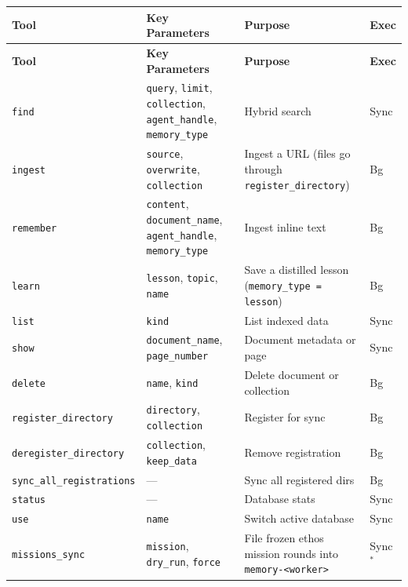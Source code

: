 \documentclass[a4paper,10pt]{article}
\newcommand{\tool}[1]{\texttt{#1}}
\newcommand{\field}[1]{\texttt{#1}}
\begin{document}
\begin{center}
\small
\setlength{\tabcolsep}{4pt}
\begin{longtable}{lp{3.5cm}p{3.2cm}l}
\toprule
\textbf{Tool} & \textbf{Key Parameters} & \textbf{Purpose} &
  \textbf{Exec} \\
\midrule
\endfirsthead
\toprule
\textbf{Tool} & \textbf{Key Parameters} & \textbf{Purpose} &
  \textbf{Exec} \\
\midrule
\endhead
\tool{find}        & \field{query}, \field{limit},
  \field{collection}, \field{agent\_handle},
  \field{memory\_type}     & Hybrid search              & Sync \\
\tool{ingest}      & \field{source}, \field{overwrite},
  \field{collection}       & Ingest a URL (files go through
                             \tool{register\_directory}) & Bg \\
\tool{remember}    & \field{content},
  \field{document\_name}, \field{agent\_handle},
  \field{memory\_type}     & Ingest inline text         & Bg \\
\tool{learn}       & \field{lesson}, \field{topic},
  \field{name}             & Save a distilled lesson
                             (\texttt{memory\_type = lesson}) & Bg \\
\tool{list}        & \field{kind}
                           & List indexed data          & Sync \\
\tool{show}        & \field{document\_name},
  \field{page\_number}     & Document metadata or page  & Sync \\
\tool{delete}      & \field{name}, \field{kind}
                           & Delete document or
                             collection                 & Bg \\
\tool{register\_directory}   & \field{directory},
  \field{collection}       & Register for sync          & Bg \\
\tool{deregister\_directory} & \field{collection},
  \field{keep\_data}       & Remove registration        & Bg \\
\tool{sync\_all\_registrations} & ---  & Sync all registered dirs & Bg \\
\tool{status}      & ---  & Database stats             & Sync \\
\tool{use}         & \field{name}
                           & Switch active database     & Sync \\
\tool{missions\_sync} & \field{mission}, \field{dry\_run},
  \field{force}            & File frozen ethos mission rounds
                             into \texttt{memory-<worker>} & Sync$^{*}$ \\
\bottomrule
\end{longtable}
\end{center}
\end{document}

